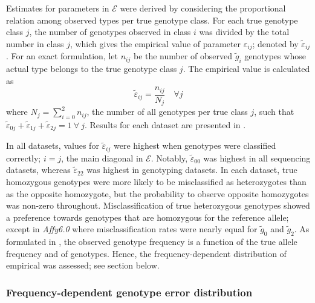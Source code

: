 Estimates for  parameters in $\mathcal{E}$ were derived by considering the proportional relation among observed types per true genotype class.
For each true genotype class $j$, the number of genotypes observed in class $i$ was divided by the total number in class $j$, which gives the empirical value of parameter $\varepsilon_{ij}$; denoted by $\tilde{\varepsilon}_{ij}$.
For an exact formulation, let $n_{ij}$ be the number of observed $\tilde{g}_i$ genotypes whose actual type belongs to the true genotype class $j$.
The empirical value is calculated as
\begin{equation}\label{eq:empexperr}
	\tilde{\varepsilon}_{ij} = \frac{n_{ij}}{N_j} \quad \forall j
\end{equation}
where ${N_j = \sum^{2}_{i=0} n_{ij}}$, \ie the number of all genotypes per true class $j$, such that ${\tilde{\varepsilon}_{0j} + \tilde{\varepsilon}_{1j} + \tilde{\varepsilon}_{2j} = 1 \ \forall \ j}$.
Results for each dataset are presented in .

%

%

In all  datasets, values for $\tilde{\varepsilon}_{ij}$ were highest when genotypes were classified correctly; \ie ${i = j}$, the main diagonal in $\mathcal{E}$.
Notably, $\tilde{\varepsilon}_{00}$ was highest in all sequencing datasets, whereas $\tilde{\varepsilon}_{22}$ was highest in genotyping datasets.
In each dataset, true homozygous genotypes were more likely to be misclassified as heterozygotes than as the opposite homozygote, but the probability to observe opposite homozygotes was non-zero throughout.
Misclassification of true heterozygous genotypes showed a preference towards genotypes that are homozygous for the reference allele; except in \emph{Affy6.0} where misclassification rates were nearly equal for $\tilde{g}_0$ and $\tilde{g}_2$.
As formulated in , the observed genotype frequency is a function of the true allele frequency and  of genotypes.
Hence, the frequency-dependent distribution of empirical  was assessed; see section below.


%
\subsubsection{Frequency-dependent genotype error distribution}
%

